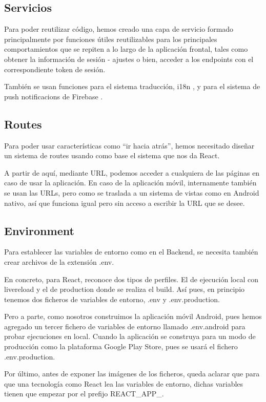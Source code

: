\subsection{Servicios}
Para poder reutilizar código, hemos creado una capa de servicio formado principalmente por funciones útiles reutilizables para los principales comportamientos que se repiten a lo largo de la aplicación frontal, tales como obtener la información de sesión - ajustes o bien, acceder a los endpoints con el correspondiente token de sesión.

También se usan funciones para el sistema traducción, i18n \cite{i18n} \cite{i18n-react}, y para el sistema de push notificacions de Firebase \cite{firebase}.

\subsection{Routes}
Para poder usar características como ``ir hacia atrás'', hemos necesitado diseñar un sistema de routes usando como base el sistema que nos da React.

A partir de aquí, mediante URL, podemos acceder a cualquiera de las páginas en caso de usar la aplicación. En caso de la aplicación móvil, internamente también se usan las URLs, pero como se traslada a un sistema de vistas como en Android nativo, así que funciona igual pero sin acceso a escribir la URL que se desee.

\subsection{Environment}
Para establecer las variables de entorno como en el Backend, se necesita también crear archivos de la extensión .env.

En concreto, para React, reconoce dos tipos de perfiles. El de ejecución local con livereload y el de production donde se realiza el build. Así pues, en principio tenemos dos ficheros de variables de entorno, .env y .env.production.

Pero a parte, como nosotros construimos la aplicación móvil Android, pues hemos agregado un tercer fichero de variables de entorno llamado .env.android para probar ejecuciones en local. Cuando la aplicación se construya para un modo de producción como la plataforma Google Play Store, pues se usará el fichero .env.production.

Por último, antes de exponer las imágenes de los ficheros, queda aclarar que para que una tecnología como React lea las variables de entorno, dichas variables tienen que empezar por el prefijo REACT\_APP\_.

